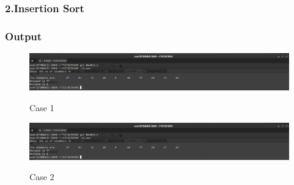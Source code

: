 \documentclass[12pt, a4paper]{article}
\begin{document}
\subsubsection*{2.Insertion Sort}

\subsubsection*{Output}
\begin{figure}[h]
\centering
\includegraphics[width=5 in,height=2 in]{./Output/im1.png}
\label{Figure 2}
\caption{Case 1}
\end{figure}
\begin{figure}[h]
\centering
\includegraphics[width=5 in,height=2 in]{./Output/im2.png}
\label{Figure 3}
\caption{Case 2}
\end{figure}
\end{document}
